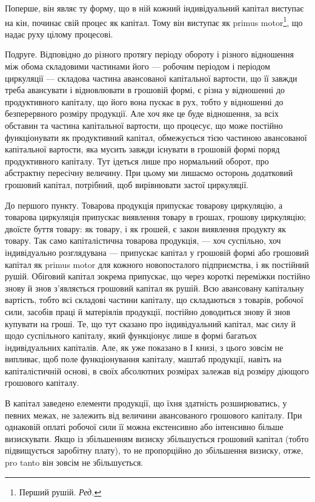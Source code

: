 Поперше, він являє ту форму, що в ній кожний індивідуальний капітал
виступає на кін, починає свій процес як капітал. Тому він виступає
як primus motor\footnote*{
Перший рушій. \emph{Ред.}
}, що надає руху цілому процесові.

Подруге. Відповідно до різного протягу періоду обороту і різного
відношення між обома складовими частинами його — робочим періодом і
періодом циркуляції — складова частина авансованої капітальної вартости,
що її завжди треба авансувати і відновлювати в грошовій формі, є різна
у відношенні до продуктивного капіталу, що його вона пускає в рух,
тобто у відношенні до безперервного розміру продукції. Але хоч яке
це буде відношення, за всіх обставин та частина капітальної вартости,
що процесує, що може постійно функціонувати як продуктивний капітал,
обмежується тією частиною авансованої капітальної вартости, яка мусить
завжди існувати в грошовій формі поряд продуктивного капіталу. Тут
ідеться лише про нормальний оборот, про абстрактну пересічну величину.
При цьому ми лишаємо осторонь додатковий грошовий капітал,
потрібний, щоб вирівнювати застої циркуляції.

До першого пункту. Товарова продукція припускає товарову
циркуляцію, а товарова циркуляція припускає виявлення товару в грошах,
грошову циркуляцію; двоїсте буття товару: як товару, і як грошей,
є закон виявлення продукту як товару. Так само капіталістична товарова
продукція, — хоч суспільно, хоч індивідуально розглядувана —
припускає капітал у грошовій формі або грошовий капітал як primus
motor для кожного новопосталого підприємства, і як постійний рушій. Обіговий
капітал зокрема припускає, що через короткі переміжки постійно
знову й знов з’являється грошовий капітал як рушій. Всю авансовану
капітальну вартість, тобто всі складові частини капіталу, що складаються
з товарів, робочої сили, засобів праці й матеріялів продукції, постійно
доводиться знову й знов купувати на гроші. Те, що тут сказано про індивідуальний
капітал, має силу й щодо суспільного капіталу, який функціонує
лише в формі багатьох індивідуальних капіталів. Але, як уже показано
в І книзі, з цього зовсім не випливає, щоб поле функціонування
капіталу, маштаб продукції, навіть на капіталістичній основі, в своїх
абсолютних розмірах залежав від розміру діющого грошового капіталу.

В капітал заведено елементи продукції, що їхня здатність розширюватись,
у певних межах, не залежить від величини авансованого грошового
капіталу. При однаковій оплаті робочої сили її можна екстенсивно
або інтенсивно більше визискувати. Якщо із збільшенням визиску збільшується
грошовий капітал (тобто підвищується заробітну плату), то не
пропорційно до збільшення визиску, отже, pro tanto він зовсім не збільшується.

